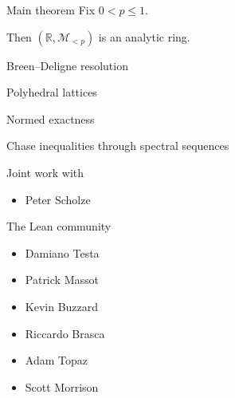 \documentclass[12pt,aspectratio=169]{beamer}
\def\Z{\mathbb{Z}}
\def\R{\mathbb{R}}
\begin{document}
\begin{frame}{Main theorem}
	Fix $0 < p \le 1$.
	
	Then $(\R, \mathcal M_{< p})$ is an analytic ring.
\end{frame}

\begin{frame}
\end{frame}

\begin{frame}
	Breen--Deligne resolution

	\pause

	Polyhedral lattices

	\pause

	Normed exactness

	\pause

	Chase inequalities through spectral sequences
\end{frame}

\begin{frame}{Joint work with}
	\begin{itemize}
		\item Peter Scholze
	\end{itemize}

	The Lean community
	\begin{itemize}
		\item Damiano Testa
		\item Patrick Massot
		\item Kevin Buzzard
		\item Riccardo Brasca
		\item Adam Topaz
		\item Scott Morrison
	\end{itemize}
\end{frame}
\end{document}
